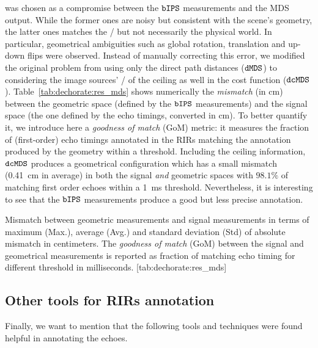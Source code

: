  was chosen as a compromise between the $\mathtt{bIPS}$ measurements and the \ac{MDS} output.
While the former ones are noisy but consistent with the scene's geometry, the latter ones matches the \TOAs/ but not necessarily the physical world.
In particular, geometrical ambiguities such as global rotation, translation and up-down flips were observed.
Instead of manually correcting this error, we modified the original problem from using only the direct path distances ($\mathtt{dMDS}$) to considering the  image sources' \TOA/ of the ceiling as well in the cost function ($\mathtt{dcMDS}$).
Table~\ref{tab:dechorate:res_mds} shows numerically the \textit{mismatch} (in cm) between the geometric space (defined by the $\mathtt{bIPS}$ measurements) and the signal space (the one defined by the echo timings, converted in cm).
To better quantify it, we introduce here a \textit{goodness of match} (GoM) metric: it measures the fraction of (first-order) echo timings annotated in the \acp{RIR} matching the annotation produced by the geometry within a threshold.
Including the ceiling information, $\mathtt{dcMDS}$ produces a geometrical configuration which has a small mismatch (0.41~cm in average) in both the signal \textit{and} geometric spaces with $98.1\%$ of matching first order echoes within a 1~ms threshold.
Nevertheless, it is interesting to see that the $\mathtt{bIPS}$ measurements produce a good but less precise annotation.

\begin{table}[]
    \begin{sidecaption}[]{
        Mismatch between geometric measurements and signal measurements in terms of maximum (Max.), average (Avg.) and standard deviation (Std) of absolute mismatch in centimeters. The \textit{goodness of match} (GoM) between the signal and geometrical measurements is reported as fraction of matching echo timing for different threshold in milliseconds.
        }[tab:dechorate:res_mds]
        \centering
        \small
        
    \end{sidecaption}
\end{table}

\subsection{Other tools for RIRs annotation}
Finally, we want to mention that the following tools and techniques were found helpful in annotating the echoes.

